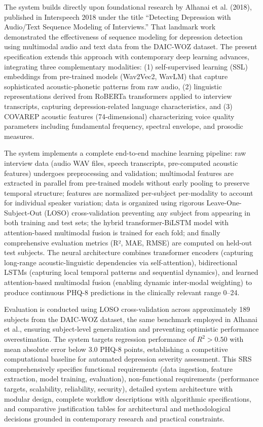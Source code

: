 \documentclass[12pt]{article}
\begin{document}
	\vspace{0.8em}
	\noindent
	The system builds directly upon foundational research by Alhanai et al. (2018), published in Interspeech 2018 under the title ``Detecting Depression with Audio/Text Sequence Modeling of Interviews.'' That landmark work demonstrated the effectiveness of sequence modeling for depression detection using multimodal audio and text data from the DAIC-WOZ dataset. The present specification extends this approach with contemporary deep learning advances, integrating three complementary modalities: (1) self-supervised learning (SSL) embeddings from pre-trained models (Wav2Vec2, WavLM) that capture sophisticated acoustic-phonetic patterns from raw audio, (2) linguistic representations derived from RoBERTa transformers applied to interview transcripts, capturing depression-related language characteristics, and (3) COVAREP acoustic features (74-dimensional) characterizing voice quality parameters including fundamental frequency, spectral envelope, and prosodic measures.

	\vspace{0.8em}
	\noindent
	The system implements a complete end-to-end machine learning pipeline: raw interview data (audio WAV files, speech transcripts, pre-computed acoustic features) undergoes preprocessing and validation; multimodal features are extracted in parallel from pre-trained models without early pooling to preserve temporal structure; features are normalized per-subject per-modality to account for individual speaker variation; data is organized using rigorous Leave-One-Subject-Out (LOSO) cross-validation preventing any subject from appearing in both training and test sets; the hybrid transformer-BiLSTM model with attention-based multimodal fusion is trained for each fold; and finally comprehensive evaluation metrics (R², MAE, RMSE) are computed on held-out test subjects. The neural architecture combines transformer encoders (capturing long-range acoustic-linguistic dependencies via self-attention), bidirectional LSTMs (capturing local temporal patterns and sequential dynamics), and learned attention-based multimodal fusion (enabling dynamic inter-modal weighting) to produce continuous PHQ-8 predictions in the clinically relevant range 0--24.

	\vspace{0.8em}
	\noindent
	Evaluation is conducted using LOSO cross-validation across approximately 189 subjects from the DAIC-WOZ dataset, the same benchmark employed in Alhanai et al., ensuring subject-level generalization and preventing optimistic performance overestimation. The system targets regression performance of $R^2 > 0.50$ with mean absolute error below 3.0 PHQ-8 points, establishing a competitive computational baseline for automated depression severity assessment. This SRS comprehensively specifies functional requirements (data ingestion, feature extraction, model training, evaluation), non-functional requirements (performance targets, scalability, reliability, security), detailed system architecture with modular design, complete workflow descriptions with algorithmic specifications, and comparative justification tables for architectural and methodological decisions grounded in contemporary research and practical constraints.
\end{document}
